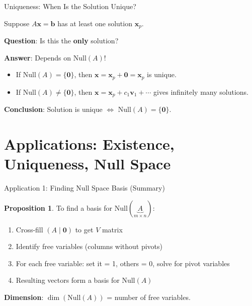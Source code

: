 \documentclass[10pt]{beamer}
\theoremstyle{definition}
\newtheorem{prop}{Proposition}[section]
\newcommand{\x}[1]{\alert{\textbf{#1}}}
\begin{document}
\begin{frame}{Uniqueness: When Is the Solution Unique?}

Suppose $A\mathbf{x} = \mathbf{b}$ has at least one solution $\mathbf{x}_p$.

\vspace{1em}

\x{Question}: Is this the \textbf{only} solution?

\vspace{1em}

\x{Answer}: Depends on $\text{Null}(A)$!

\begin{itemize}
\item If $\text{Null}(A) = \{\mathbf{0}\}$, then $\mathbf{x} = \mathbf{x}_p + \mathbf{0} = \mathbf{x}_p$ is unique.
\item If $\text{Null}(A) \neq \{\mathbf{0}\}$, then $\mathbf{x} = \mathbf{x}_p + c_1\mathbf{v}_1 + \cdots$ gives infinitely many solutions.
\end{itemize}

\vspace{1em}

\x{Conclusion}: Solution is unique $\iff$ $\text{Null}(A) = \{\mathbf{0}\}$.

\end{frame}

\section{Applications: Existence, Uniqueness, Null Space}

\begin{frame}{Application 1: Finding Null Space Basis (Summary)}

\begin{prop}
To find a basis for $\text{Null}(\underbrace{A}_{m \times n})$:

\begin{enumerate}
\item Cross-fill $(A \mid \mathbf{0})$ to get $V$ matrix
\item Identify free variables (columns without pivots)
\item For each free variable: set it = 1, others = 0, solve for pivot variables
\item Resulting vectors form a basis for $\text{Null}(A)$
\end{enumerate}
\end{prop}

\vspace{0.5em}

\x{Dimension}: $\dim(\text{Null}(A))$ = number of free variables.

\end{frame}
\end{document}
